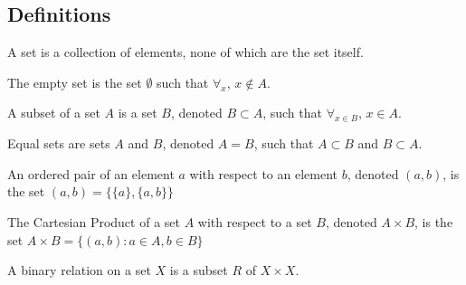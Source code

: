 \documentclass[crop=false,class=book,oneside]{standalone}
\begin{document}
        \subsection{Definitions}
            \begin{definition}
                \label{Definition:MathEnc:Analysis:Sum:Sets}
                A set is a collection of elements, none of which
                are the set itself.
            \end{definition}
            \begin{definition}
                \label{Definition:MathEnc:Analysis:Sum:EmptySet}
                The empty set is the set $\emptyset$
                such that $\forall_{x}$, $x\notin A$.
            \end{definition}
            \begin{definition}
                \label{Definition:MathEnc:Analysis:Sum:Subsets}
                A subset of a set $A$ is a set $B$, denoted
                $B\subset A$, such that $\forall_{x\in B}$,
                $x\in A$.
            \end{definition}
            \begin{definition}
                \label{Definition:MathEnc:Analysis:Sum:Equality}
                Equal sets are sets $A$ and $B$, denoted $A=B$,
                such that $A\subset B$ and $B\subset A$.
            \end{definition}
            \begin{definition}
                \label{Definition:MathEnc:Analysis:Sum:OrderedPair}
                An ordered pair of an element $a$ with respect
                to an element $b$, denoted $(a,b)$,
                is the set $(a,b)=\{\{a\},\{a,b\}\}$
            \end{definition}
            \begin{definition}
                \label{%
                    Definition:MathEnc:Analysis:%
                    Sum:CartesianProduct%
                }
                The Cartesian Product of a set $A$ with respect
                to a set $B$, denoted $A\times B$, is the set
                $A\times B=\{(a,b):a\in A,b\in B\}$
            \end{definition}
            \begin{definition}
                \label{%
                    Definition:MathEnc:Analysis:%
                    Sum:BinaryRelation%
                }
                A binary relation on a set $X$ is
                a subset $R$ of $X\times X$.
            \end{definition}
\end{document}
